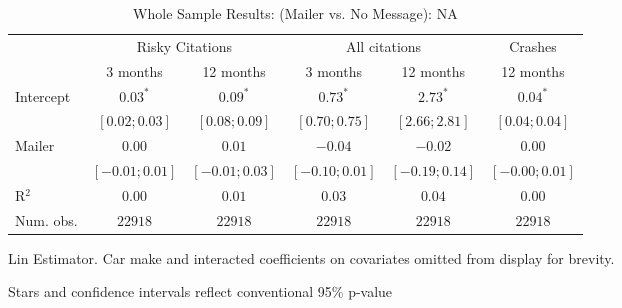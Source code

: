 
\begin{table}
\caption{Whole Sample Results: (Mailer vs. No Message): NA}
\begin{center}
\begin{threeparttable}
\begin{tabular}{l c c c c c}
\hline
 & \multicolumn{2}{c}{Risky Citations} & \multicolumn{2}{c}{All citations} & \multicolumn{1}{c}{Crashes} \\
\cline{2-3} \cline{4-5} \cline{6-6}
 & 3 months & 12 months & 3 months & 12 months & 12 months \\
\hline
Intercept & $0.03^{*}$       & $0.09^{*}$       & $0.73^{*}$       & $2.73^{*}$       & $0.04^{*}$       \\
          & $ [ 0.02; 0.03]$ & $ [ 0.08; 0.09]$ & $ [ 0.70; 0.75]$ & $ [ 2.66; 2.81]$ & $ [ 0.04; 0.04]$ \\
Mailer    & $0.00$           & $0.01$           & $-0.04$          & $-0.02$          & $0.00$           \\
          & $ [-0.01; 0.01]$ & $ [-0.01; 0.03]$ & $ [-0.10; 0.01]$ & $ [-0.19; 0.14]$ & $ [-0.00; 0.01]$ \\
\hline
R$^2$     & $0.00$           & $0.01$           & $0.03$           & $0.04$           & $0.00$           \\
Num. obs. & $22918$          & $22918$          & $22918$          & $22918$          & $22918$          \\
\hline
\end{tabular}
\begin{tablenotes}[flushleft]
\scriptsize{\item Lin Estimator. Car make and interacted coefficients on covariates omitted from display for brevity.
                             \item Stars and confidence intervals reflect conventional 95\% p-value}
\end{tablenotes}
\end{threeparttable}
\label{table:coefficients}
\end{center}
\end{table}
